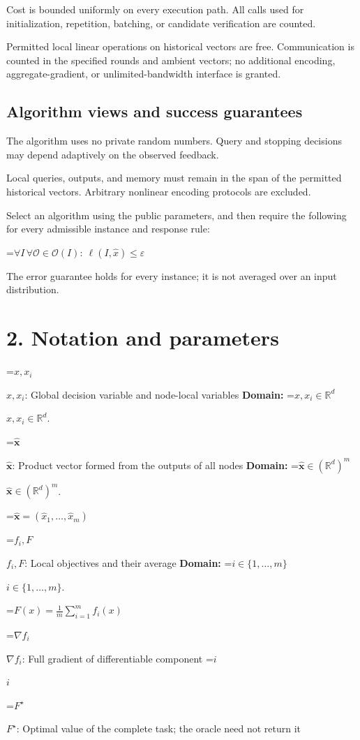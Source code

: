 \documentclass[10pt,a4paper]{article}
\newcommand{\AtlasMath}[1]{\par\begingroup\centering\setbox0=\hbox{$\displaystyle #1$}\ifdim\wd0>1.4\linewidth\typeout{ATLAS WIDE FORMULA: \the\wd0}\fi\ifdim\wd0>\linewidth\resizebox{\linewidth}{!}{\box0}\else\box0\fi\par\endgroup}
\newcommand{\AtlasInlineMath}[1]{\begingroup\setbox0=\hbox{$#1$}\ifdim\wd0>.4\linewidth\endgroup\AtlasMath{#1}\else\endgroup$#1$\fi}
\begin{document}
Cost is bounded uniformly on every execution path. All calls used for initialization, repetition, batching, or candidate verification are counted.

Permitted local linear operations on historical vectors are free. Communication is counted in the specified rounds and ambient vectors; no additional encoding, aggregate-gradient, or unlimited-bandwidth interface is granted.

\subsection{Algorithm views and success guarantees}
The algorithm uses no private random numbers. Query and stopping decisions may depend adaptively on the observed feedback.

Local queries, outputs, and memory must remain in the span of the permitted historical vectors. Arbitrary nonlinear encoding protocols are excluded.

Select an algorithm using the public parameters, and then require the following for every admissible instance and response rule:


\AtlasMath{\forall I\,\forall\mathcal{O}\in\mathcal{O}(I):\ \ell(I,\widehat{x})\le\varepsilon}


The error guarantee holds for every instance; it is not averaged over an input distribution.

\section{2. Notation and parameters}
\AtlasInlineMath{x,x_i}: Global decision variable and node-local variables \textbf{Domain:} \AtlasInlineMath{x,x_i\in \mathbb{R}^d}.

\AtlasInlineMath{\widehat{\boldsymbol x}}: Product vector formed from the outputs of all nodes \textbf{Domain:} \AtlasInlineMath{\widehat{\boldsymbol x}\in (\mathbb{R}^d)^m}.


\AtlasMath{\widehat{\boldsymbol x}=(\widehat{x}_1,\ldots,\widehat{x}_m)}


\AtlasInlineMath{f_i,F}: Local objectives and their average \textbf{Domain:} \AtlasInlineMath{i\in\{1,\ldots,m\}}.


\AtlasMath{F(x)=\frac1m\sum_{i=1}^m f_i(x)}


\AtlasInlineMath{\nabla f_i}: Full gradient of differentiable component \AtlasInlineMath{i}

\AtlasInlineMath{F^\star}: Optimal value of the complete task; the oracle need not return it
\end{document}
